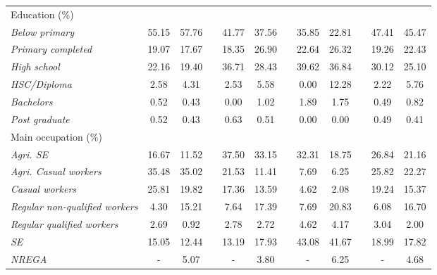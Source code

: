 \begin{table}[htbp]
{\begin{tabular}{lccccccccccc}
    Education (\%) &   &   &   &   &   &   &   &   &   &   &  \\
    \hspace*{0.2cm} \textit{Below primary} & 55.15 & 57.76 &   & 41.77 & 37.56 &   & 35.85 & 22.81 &   & 47.41 & 45.47 \\
    \hspace*{0.2cm} \textit{Primary completed} & 19.07 & 17.67 &   & 18.35 & 26.90 &   & 22.64 & 26.32 &   & 19.26 & 22.43 \\
    \hspace*{0.2cm} \textit{High school} & 22.16 & 19.40 &   & 36.71 & 28.43 &   & 39.62 & 36.84 &   & 30.12 & 25.10 \\
    \hspace*{0.2cm} \textit{HSC/Diploma} & 2.58 & 4.31 &   & 2.53 & 5.58 &   & 0.00 & 12.28 &   & 2.22 & 5.76 \\
    \hspace*{0.2cm} \textit{Bachelors} & 0.52 & 0.43 &   & 0.00 & 1.02 &   & 1.89 & 1.75 &   & 0.49 & 0.82 \\
    \hspace*{0.2cm} \textit{Post graduate} & 0.52 & 0.43 &   & 0.63 & 0.51 &   & 0.00 & 0.00 &   & 0.49 & 0.41 \\
    Main occupation (\%) &   &   &   &   &   &   &   &   &   &   &  \\
    \hspace*{0.2cm} \textit{Agri. SE} & 16.67 & 11.52 &   & 37.50 & 33.15 &   & 32.31 & 18.75 &   & 26.84 & 21.16 \\
    \hspace*{0.2cm} \textit{Agri. Casual workers} & 35.48 & 35.02 &   & 21.53 & 11.41 &   & 7.69 & 6.25 &   & 25.82 & 22.27 \\
    \hspace*{0.2cm} \textit{Casual workers} & 25.81 & 19.82 &   & 17.36 & 13.59 &   & 4.62 & 2.08 &   & 19.24 & 15.37 \\
    \hspace*{0.2cm} \textit{Regular non-qualified workers} & 4.30 & 15.21 &   & 7.64 & 17.39 &   & 7.69 & 20.83 &   & 6.08 & 16.70 \\
    \hspace*{0.2cm} \textit{Regular qualified workers} & 2.69 & 0.92 &   & 2.78 & 2.72 &   & 4.62 & 4.17 &   & 3.04 & 2.00 \\
    \hspace*{0.2cm} \textit{SE} & 15.05 & 12.44 &   & 13.19 & 17.93 &   & 43.08 & 41.67 &   & 18.99 & 17.82 \\
    \hspace*{0.2cm} \textit{NREGA} & - & 5.07 &   & - & 3.80 &   & - & 6.25 &   & - & 4.68 \\
    \bottomrule
    \end{tabular}%

	}
  \label{Global}%
\end{table}%
